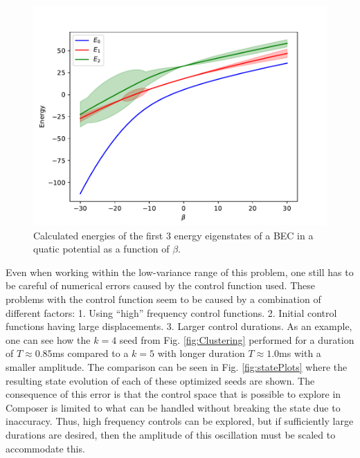 \documentclass[a4paper, twocolumn]{revtex4-1}
\begin{document}
\begin{figure}
	\includegraphics[width=\columnwidth]{graphics/stateAnalysis/Energylevels.pdf}
	\caption{Calculated energies of the first 3 energy eigenstates of a BEC in a quatic potential as a function of $\beta$.}
	\label{fig:energyLevels}
\end{figure}

Even when working within the low-variance range of this problem, one still has to be careful of numerical errors caused by the control function used. These problems with the control function seem to be caused by a combination of different factors: 1. Using ``high'' frequency control functions. 2. Initial control functions having large displacements. 3. Larger control durations. As an example, one can see how the $k=4$ seed from Fig. \ref{fig:Clustering} performed for a duration of $T\approx 0.85$ms compared to a $k=5$ with longer duration  $T\approx 1.0$ms with a smaller amplitude. The comparison can be seen in Fig. \ref{fig:statePlots} where the resulting state evolution of each of these optimized seeds are shown. The consequence of this error is that the control space that is possible to explore in Composer is limited to what can be handled without breaking the state due to inaccuracy. Thus, high frequency controls can be explored, but if sufficiently large durations are desired, then the amplitude of this oscillation must be scaled to accommodate this.
\end{document}
